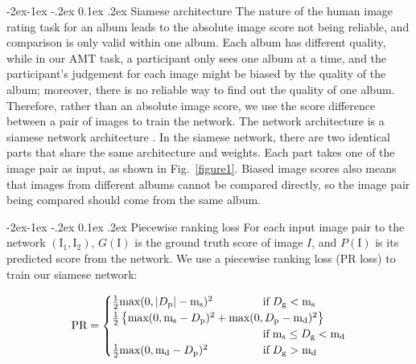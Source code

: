 \documentclass[10pt,twocolumn,letterpaper]{article}
\makeatletter
\renewcommand\subsubsection{\@startsection{subsubsection}{3}{\z@}%
                {-2ex\@plus -1ex \@minus -.2ex}%
                {0.1ex \@plus .2ex}%
                {\normalfont\normalsize\bfseries}}
\makeatother
\begin{document}
 \subsubsection{Siamese architecture} 
 The  nature of the human image rating task for an album leads to the absolute image score not being reliable, and comparison is only valid within one album. Each album has different quality, while in our AMT task, a participant only sees one album at a time, and the participant's judgement for each image might be biased by the quality of the album; moreover, there is no reliable way to find out the quality of one album. Therefore, rather than an absolute image score, we use the score difference between a pair of images to train the network. The network architecture is a siamese network architecture \cite{siamese}. In the siamese network, there are two identical parts that share the same architecture and weights. Each part takes one of the image pair as input, as shown in Fig.~\ref{figure1}.  Biased image scores also means that images from different albums cannot be compared directly, so the image pair being compared should come from the same album.
 
\subsubsection{Piecewise ranking loss} 
For each input image pair to the network $(\text{I}_{1}, \text{I}_{2})$, $G(\text{I})$ is the ground truth score of  image $I$, and $P(\text{I})$ is its predicted score from the network. We use a piecewise ranking loss (PR loss) to train our siamese network:

\begin{equation} 
  \text{PR} = \begin{cases}
 \frac{1}{2}\text{max}(0, \left | D_\text{p} \right |-\text{m}_\text{s})^{2} &\text{if}  \; D_\text{g} < \text{m}_\text{s}\\
\mathrlap{\frac{1}{2}\left \{ \text{max}(0, \text{m}_\text{s}-D_\text{p})^{2} + \text{max}(0, D_\text{p}-\text{m}_\text{d})^{2} \right \}} \\
 & \text{if} \;  \text{m}_\text{s} \leq D_\text{g}  < \text{m}_\text{d} \\
 \frac{1}{2}\text{max}(0, \text{m}_\text{d}-D_\text{p})^{2} \; \; \; \; \; \;  \; \;\; \;  \; \; \; \;   & \text{if}  \; D_\text{g}  > \text{m}_\text{d}
\end{cases}
\label{loss_function}
\end{equation}
\end{document}
